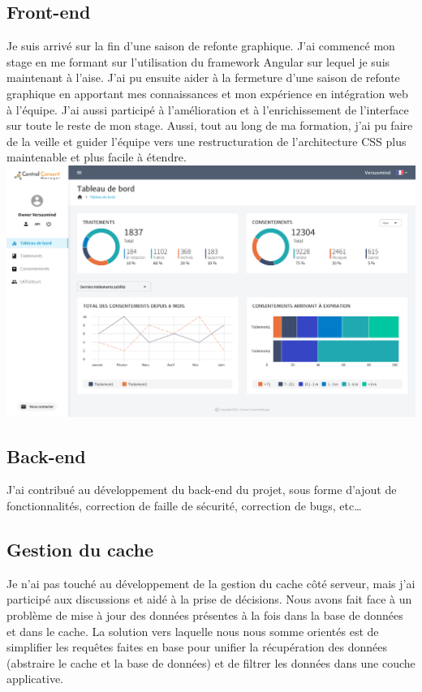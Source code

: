 \documentclass[12pt, a4paper]{report}
\newcommand\tab[1][1cm]{\hspace*{#1}}
\begin{document}
            \subsection{Front-end}
                \tab{} Je suis arrivé sur la fin d'une saison de refonte graphique.
                J'ai commencé mon stage en me formant sur l'utilisation du framework Angular sur lequel je suis maintenant à l'aise.
                J'ai pu ensuite aider à la fermeture d'une saison de refonte graphique en apportant mes connaissances et mon expérience en intégration web à l'équipe.\newline
                J'ai aussi participé à l'amélioration et à l'enrichissement de l'interface sur toute le reste de mon stage.
                Aussi, tout au long de ma formation, j'ai pu faire de la veille et guider l'équipe vers une restructuration de l'architecture CSS plus maintenable et plus facile à étendre.\newline
                \includegraphics[width=\linewidth]{dashboard.png}
            \subsection{Back-end}
                J'ai contribué au développement du back-end du projet, sous forme d'ajout de fonctionnalités, correction de faille de sécurité, correction de bugs, etc\ldots
            \subsection{Gestion du cache}
                Je n'ai pas touché au développement de la gestion du cache côté serveur, mais j'ai participé aux discussions et aidé à la prise de décisions.
                Nous avons fait face à un problème de mise à jour des données présentes à la fois dans la base de données et dans le cache. La solution vers laquelle nous nous somme orientés est de simplifier les requêtes faites en base pour unifier la récupération des données (abstraire le cache et la base de données) et de filtrer les données dans une couche applicative.
\end{document}
